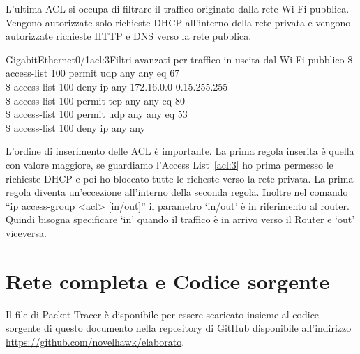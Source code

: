 L'ultima ACL si occupa di filtrare il traffico originato dalla rete Wi-Fi pubblica. Vengono autorizzate solo richieste DHCP all'interno della rete privata e vengono autorizzate richieste HTTP e DNS verso la rete pubblica.

\begin{cmds}[in]{GigabitEthernet0/1}{acl:3}{Filtri avanzati per traffico in uscita dal Wi-Fi pubblico}
    \$ access-list 100 permit udp any any eq 67\\
    \$ access-list 100 deny ip any 172.16.0.0 0.15.255.255\\
    \$ access-list 100 permit tcp any any eq 80\\
    \$ access-list 100 permit udp any any eq 53\\
    \$ access-list 100 deny ip any any
\end{cmds}

L'ordine di inserimento delle ACL \`e importante. La prima regola inserita \`e quella con valore maggiore, se guardiamo l'Access List~\ref{acl:3} ho prima permesso le richieste DHCP e poi ho bloccato tutte le richeste verso la rete privata. La prima regola diventa un'eccezione all'interno della seconda regola. Inoltre nel comando ``ip access-group <acl> [in/out]'' il parametro `in/out' \`e in riferimento al router. Quindi bisogna specificare `in' quando il traffico \`e in arrivo verso il Router e `out' viceversa.

\setlength{\parskip}{0em}

\section{Rete completa e Codice sorgente}

Il file di Packet Tracer \`e disponibile per essere scaricato insieme al codice sorgente di questo documento nella repository di GitHub disponibile all'indirizzo \url{https://github.com/novelhawk/elaborato}.